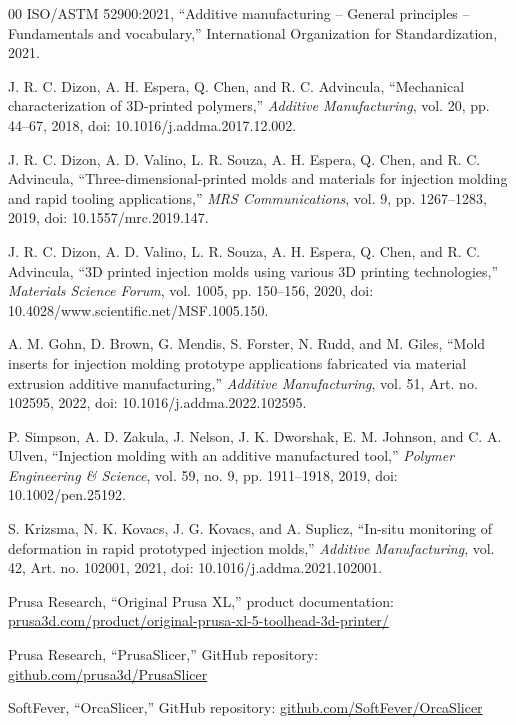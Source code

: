 \documentclass[conference]{IEEEtran}
\begin{document}
\balance
\begin{thebibliography}{00}
ISO/ASTM 52900:2021, ``Additive manufacturing -- General principles -- Fundamentals and vocabulary,'' International Organization for Standardization, 2021.

J. R. C. Dizon, A. H. Espera, Q. Chen, and R. C. Advincula, ``Mechanical characterization of 3D-printed polymers,'' \emph{Additive Manufacturing}, vol. 20, pp. 44--67, 2018, doi: 10.1016/j.addma.2017.12.002.

J. R. C. Dizon, A. D. Valino, L. R. Souza, A. H. Espera, Q. Chen, and R. C. Advincula, ``Three-dimensional-printed molds and materials for injection molding and rapid tooling applications,'' \emph{MRS Communications}, vol. 9, pp. 1267--1283, 2019, doi: 10.1557/mrc.2019.147.

J. R. C. Dizon, A. D. Valino, L. R. Souza, A. H. Espera, Q. Chen, and R. C. Advincula, ``3D printed injection molds using various 3D printing technologies,'' \emph{Materials Science Forum}, vol. 1005, pp. 150--156, 2020, doi: 10.4028/www.scientific.net/MSF.1005.150.

A. M. Gohn, D. Brown, G. Mendis, S. Forster, N. Rudd, and M. Giles, ``Mold inserts for injection molding prototype applications fabricated via material extrusion additive manufacturing,'' \emph{Additive Manufacturing}, vol. 51, Art. no. 102595, 2022, doi: 10.1016/j.addma.2022.102595.

P. Simpson, A. D. Zakula, J. Nelson, J. K. Dworshak, E. M. Johnson, and C. A. Ulven, ``Injection molding with an additive manufactured tool,'' \emph{Polymer Engineering \& Science}, vol. 59, no. 9, pp. 1911--1918, 2019, doi: 10.1002/pen.25192.

S. Krizsma, N. K. Kovacs, J. G. Kovacs, and A. Suplicz, ``In-situ monitoring of deformation in rapid prototyped injection molds,'' \emph{Additive Manufacturing}, vol. 42, Art. no. 102001, 2021, doi: 10.1016/j.addma.2021.102001.

Prusa Research, ``Original Prusa XL,'' product documentation: \url{prusa3d.com/product/original-prusa-xl-5-toolhead-3d-printer/}

Prusa Research, ``PrusaSlicer,'' GitHub repository: \url{github.com/prusa3d/PrusaSlicer}

SoftFever, ``OrcaSlicer,'' GitHub repository: \url{github.com/SoftFever/OrcaSlicer}
\end{thebibliography}
\end{document}
